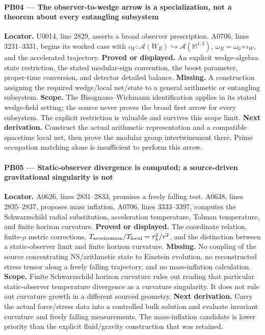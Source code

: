 \documentclass[10pt,a4paper,oneside]{report}
\begin{document}
\paragraph{PB04 --- The observer-to-wedge arrow is a specialization, not
a theorem about every entangling
subsystem}\label{pb04-the-observer-to-wedge-arrow-is-a-specialization-not-a-theorem-about-every-entangling-subsystem}

\textbf{Locator.} U0014, line 2829, asserts a broad observer
prescription. A0706, lines 3231--3331, begins its worked case with
\(\iota_W:\mathcal A(W_R)\hookrightarrow\mathcal A(\mathbb M^{1,3})\),
\(\omega_R=\omega_0\circ\iota_W\), and the accelerated trajectory.
\textbf{Proved or displayed.} An explicit wedge-algebra state
restriction, the stated modular-sign convention, the boost parameter,
proper-time conversion, and detector detailed balance. \textbf{Missing.}
A construction assigning the required wedge/local net/state to a general
arithmetic or entangling subsystem. \textbf{Scope.} The
Bisognano--Wichmann identification applies in its stated wedge-field
setting; the source never proves the broad first arrow for every
subsystem. The explicit restriction is valuable and survives this scope
limit. \textbf{Next derivation.} Construct the actual arithmetic
representation and a compatible spacetime local net, then prove the
modular group intertwinement there. Prime occupation matching alone is
insufficient to perform this arrow.

\paragraph{PB05 --- Static-observer divergence is computed; a
source-driven gravitational singularity is
not}\label{pb05-static-observer-divergence-is-computed-a-source-driven-gravitational-singularity-is-not}

\textbf{Locator.} A0626, lines 2831--2833, promises a freely falling
test. A0638, lines 2835--2837, proposes mass inflation. A0706, lines
3333--3397, computes the Schwarzschild radial substitution, acceleration
temperature, Tolman temperature, and finite horizon curvature.
\textbf{Proved or displayed.} The coordinate relation, finite-\(\rho\)
metric corrections, \(T_{\rm acceleration}/T_{\rm local}=r_h^2/r^2\),
and the distinction between a static-observer limit and finite horizon
curvature. \textbf{Missing.} No coupling of the source concentrating
NS/arithmetic state to Einstein evolution, no reconstructed stress
tensor along a freely falling trajectory, and no mass-inflation
calculation. \textbf{Scope.} Finite Schwarzschild horizon curvature
rules out reading that particular static-observer temperature divergence
as a curvature singularity. It does not rule out curvature growth in a
different sourced geometry. \textbf{Next derivation.} Carry the actual
force/stress data into a controlled bulk solution and evaluate invariant
curvature and freely falling measurements. The mass-inflation candidate
is lower priority than the explicit fluid/gravity construction that was
retained.
\end{document}
